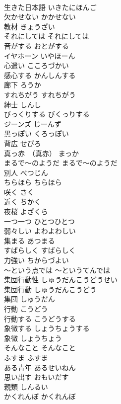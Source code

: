 \documentclass[8pt]{extreport}
\begin{document}
\begin{CJK}{UTF8}{min}
\\	生きた日本語	いきたにほんご	
\\	欠かせない	かかせない	
\\	教材	きょうざい	
\\	それにしては	それにしては	
\\	音がする	おとがする	
\\	イヤホーン	いやほーん	
\\	心遣い	こころづかい	
\\	感心する	かんしんする	
\\	廊下	ろうか	
\\	すれちがう	すれちがう	
\\	紳士	しんし	
\\	びっくりする	びくっりする	
\\	ジーンズ	じーんず	
\\	黒っぽい	くろっぽい	
\\	背広	せびろ	
\\	真っ赤　（真赤）	まっか	
\\	まるで〜のようだ	まるで〜のようだ	
\\	別人	べつじん	
\\	ちらほら	ちらほら	
\\	咲く	さく	
\\	近く	ちかく	
\\	夜桜	よざくら	
\\	一つ一つ	ひとつひとつ	
\\	弱々しい	よわよわしい	
\\	集まる	あつまる	
\\	すばらしく	すばらしく	
\\	力強い	ちからづよい	
\\	〜という点では	〜というてんでは	
\\	集団行動性	しゅうだんこうどうせい	
\\	集団行動	しゅうだんこうどう	
\\	集団	しゅうだん	
\\	行動	こうどう	
\\	行動する	こうどうする	
\\	象徴する	しょうちょうする	
\\	象徴	しょうちょう	
\\	そんなこと	そんなこと	
\\	ふすま	ふすま	
\\	ある青年	あるせいねん	
\\	思い出す	おもいだす	
\\	親類	しんるい	
\\	かくれんぼ	かくれんぼ	

\end{CJK}
\end{document}
